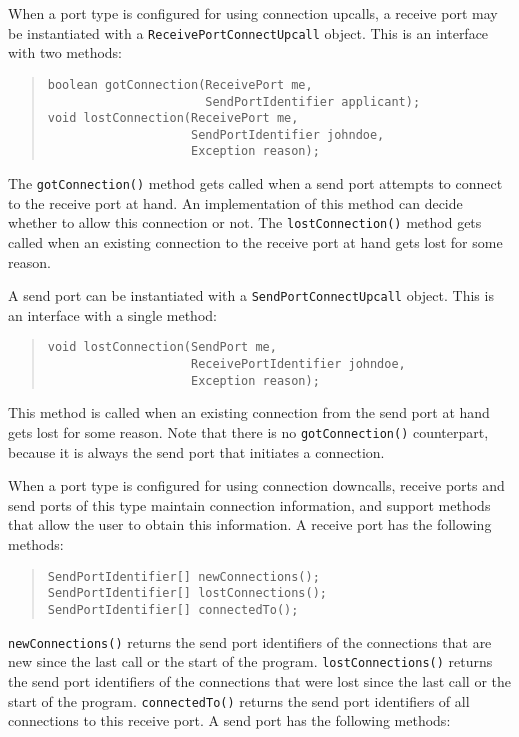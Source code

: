 \documentclass[10pt]{article}
\begin{document}
When a port type is configured for using connection upcalls,
a receive port may be instantiated with a \texttt{ReceivePortConnectUpcall}
object. This is an interface with two methods:

\begin{quote}
\begin{verbatim}
boolean gotConnection(ReceivePort me,
                      SendPortIdentifier applicant);
void lostConnection(ReceivePort me,
                    SendPortIdentifier johndoe,
                    Exception reason);
\end{verbatim}
\end{quote}
\noindent 
The \texttt{gotConnection()} method gets called when a send port attempts
to connect to the receive port at hand.
An implementation of this method can decide whether
to allow this connection or not.
The \texttt{lostConnection()} method gets called when an existing connection
to the receive port at hand gets lost for some reason.

A send port can be instantiated with a
\texttt{SendPortConnectUpcall} object. This is an interface with a single method:

\begin{quote}
\begin{verbatim}
void lostConnection(SendPort me,
                    ReceivePortIdentifier johndoe,
                    Exception reason);
\end{verbatim}
\end{quote}
\noindent 
This method is called when an existing connection from the send port at
hand gets lost for some reason. Note that there is no \texttt{gotConnection()}
counterpart, because it is always the send port that initiates a connection.

When a port type is configured for using connection downcalls, receive ports
and send ports of this type maintain connection information, and support
methods that allow the user to obtain this information.
A receive port has the following methods:

\begin{quote}
\begin{verbatim}
SendPortIdentifier[] newConnections();
SendPortIdentifier[] lostConnections();
SendPortIdentifier[] connectedTo();
\end{verbatim}
\end{quote}

\texttt{newConnections()} returns the send port identifiers of the connections
that are new since the last call or the start of the program.
\texttt{lostConnections()} returns the send port identifiers of the connections
that were lost since the last call or the start of the program.
\texttt{connectedTo()} returns the send port identifiers of all connections
to this receive port.
A send port has the following methods:
\end{document}
